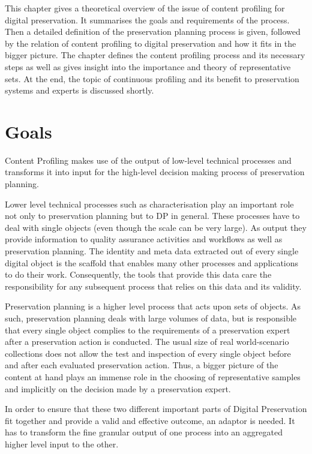 This chapter gives a theoretical overview of the issue of content profiling for digital preservation. It summarises the goals and requirements of the process. Then a detailed definition of the preservation planning process is given, followed by the relation of content profiling to digital preservation and how it fits in the bigger picture. The chapter defines the content profiling process and its necessary steps as well as gives insight into the importance and theory of representative sets. At the end, the topic of continuous profiling and its benefit to preservation systems and experts is discussed shortly.

\section {Goals}
\label{sec:goals}
Content Profiling makes use of the output of low-level technical processes and transforms it into input for the high-level decision making process of preservation planning.

Lower level technical processes such as characterisation play an important role not only to preservation planning but to DP in general. These processes have to deal with single objects (even though the scale can be very large). As output they provide information to quality assurance activities and workflows as well as preservation planning. The identity and meta data extracted out of every single digital object is the scaffold that enables many other processes and applications to do their work. Consequently, the tools that provide this data care the responsibility for any subsequent process that relies on this data and its validity.

Preservation planning is a higher level process that acts upon sets of objects. As such, preservation planning deals with large volumes of data, but is responsible that every single object complies to the requirements of a preservation expert after a preservation action is conducted. The usual size of real world-scenario collections does not allow the test and inspection of every single object before and after each evaluated preservation action. Thus, a bigger picture of the content at hand plays an immense role in the choosing of representative samples and implicitly on the decision made by a preservation expert.

In order to ensure that these two different important parts of Digital Preservation fit together and provide a valid and effective outcome, an adaptor is needed. It has to transform the fine granular output of one process into an aggregated higher level input to the other.

